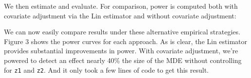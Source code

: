 \documentclass[
  12pt,
]{book}
\newenvironment{Shaded}{\begin{snugshade}}{\end{snugshade}}
\newcommand{\CommentTok}[1]{\textcolor[rgb]{0.56,0.35,0.01}{\textit{#1}}}
\newcommand{\DataTypeTok}[1]{\textcolor[rgb]{0.13,0.29,0.53}{#1}}
\newcommand{\DecValTok}[1]{\textcolor[rgb]{0.00,0.00,0.81}{#1}}
\newcommand{\FloatTok}[1]{\textcolor[rgb]{0.00,0.00,0.81}{#1}}
\newcommand{\KeywordTok}[1]{\textcolor[rgb]{0.13,0.29,0.53}{\textbf{#1}}}
\newcommand{\NormalTok}[1]{#1}
\newcommand{\OperatorTok}[1]{\textcolor[rgb]{0.81,0.36,0.00}{\textbf{#1}}}
\newcommand{\StringTok}[1]{\textcolor[rgb]{0.31,0.60,0.02}{#1}}
\theoremstyle{definition}
\theoremstyle{definition}
\theoremstyle{definition}
\theoremstyle{remark}
\begin{document}
We then estimate and evaluate. For comparison, power is computed both
with covariate adjustment via the Lin estimator and without covariate
adjustment:

\begin{Shaded}
\end{Shaded}

We can now easily compare results under these alternative empirical
strategies. Figure 3 shows the power curves for each approach. As is
clear, the Lin estimator provides substantial improvements in power.
With covariate adjustment, we're powered to detect an effect nearly 40\%
the size of the MDE without controlling for \texttt{z1} and \texttt{z2}.
And it only took a few lines of code to get this result.
\end{document}
